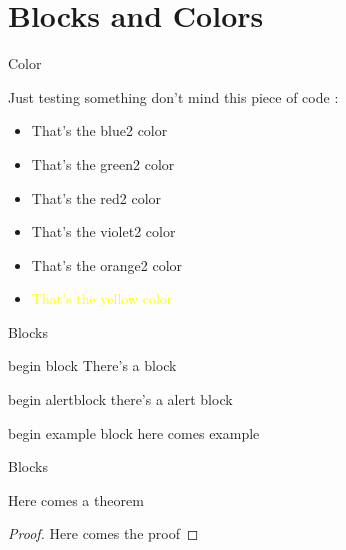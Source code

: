 \section{Blocks and Colors}
 \frame{\sectionpage}

\begin{frame}{Color}

    Just testing something don't mind this piece of code : \cite{cervantes1999}
\begin{itemize}
    \item \textcolor{blue2}{That's the blue2 color}
    \item \textcolor{green2}{That's the green2 color}
    \item \textcolor{red2}{That's the red2 color}
    \item \textcolor{violet2}{That's the violet2 color}
    \item \textcolor{orange2}{That's the orange2 color}
    \item \textcolor{yellow}{That's the yellow color}
\end{itemize}
    
\end{frame}

\begin{frame}{Blocks}
\begin{block}{begin block}
There's a block
\end{block}

\begin{alertblock}{begin alertblock}
    there's a alert block 
\end{alertblock}

\begin{exampleblock}{begin example block}
here comes example
\end{exampleblock} 

\end{frame}


\begin{frame}{Blocks}
    
\begin{theorem}
    Here comes a theorem
\end{theorem}

\begin{proof}
    Here comes the proof
\end{proof}


    
\end{frame}